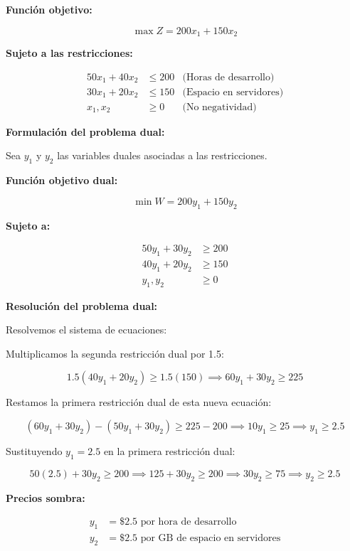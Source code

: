 \documentclass{article}
\begin{document}
\begin{multicols}{2}
\textbf{Función objetivo:}

\[
\max Z = 200x_1 + 150x_2
\]

\textbf{Sujeto a las restricciones:}

\[
\begin{aligned}
50x_1 + 40x_2 &\leq 200 & \text{(Horas de desarrollo)} \\
30x_1 + 20x_2 &\leq 150 & \text{(Espacio en servidores)} \\
x_1, x_2 &\geq 0 & \text{(No negatividad)}
\end{aligned}
\]

\textbf{Formulación del problema dual:}

Sea \( y_1 \) y \( y_2 \) las variables duales asociadas a las restricciones.

\textbf{Función objetivo dual:}

\[
\min W = 200y_1 + 150y_2
\]

\textbf{Sujeto a:}

\[
\begin{aligned}
50y_1 + 30y_2 &\geq 200 \\
40y_1 + 20y_2 &\geq 150 \\
y_1, y_2 &\geq 0
\end{aligned}
\]
    
\end{multicols}

\textbf{Resolución del problema dual:}

Resolvemos el sistema de ecuaciones:

Multiplicamos la segunda restricción dual por 1.5:

\[
1.5(40y_1 + 20y_2) \geq 1.5(150) \implies 60y_1 + 30y_2 \geq 225
\]

Restamos la primera restricción dual de esta nueva ecuación:

\[
(60y_1 + 30y_2) - (50y_1 + 30y_2) \geq 225 - 200 \implies 10y_1 \geq 25 \implies y_1 \geq 2.5
\]

Sustituyendo \( y_1 = 2.5 \) en la primera restricción dual:

\[
50(2.5) + 30y_2 \geq 200 \implies 125 + 30y_2 \geq 200 \implies 30y_2 \geq 75 \implies y_2 \geq 2.5
\]

\textbf{Precios sombra:}

\[
\begin{aligned}
y_1 &= \$2.5 \text{ por hora de desarrollo} \\
y_2 &= \$2.5 \text{ por GB de espacio en servidores}
\end{aligned}
\]
\end{document}
